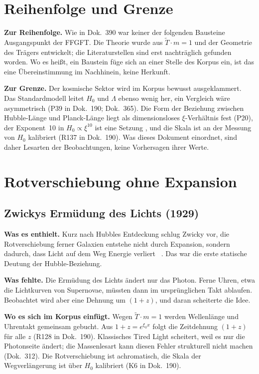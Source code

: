 \section{Reihenfolge und Grenze}

\textbf{Zur Reihenfolge.} Wie in Dok.~390 war keiner der folgenden Bausteine Ausgangspunkt der FFGFT.
Die Theorie wurde aus $\tilde T\cdot m=1$ und der Geometrie des Trägers entwickelt; die
Literaturstellen sind erst nachträglich gefunden worden. Wo es heißt, ein Baustein füge sich an
einer Stelle des Korpus ein, ist das eine Übereinstimmung im Nachhinein, keine Herkunft.

\textbf{Zur Grenze.} Der kosmische Sektor wird im Korpus bewusst ausgeklammert. Das Standardmodell
leitet $H_0$ und $\Lambda$ ebenso wenig her, ein Vergleich wäre asymmetrisch (P39 in Dok.~190;
Dok.~365). Die Form der Beziehung zwischen Hubble-Länge und Planck-Länge liegt als
dimensionsloses $\xi$-Verhältnis fest (P20), der Exponent~10 in $H_0\propto\xi^{10}$ ist eine
Setzung \SetzM, und die Skala ist an der Messung von $H_0$ kalibriert (R137 in Dok.~190). Was
dieses Dokument einordnet, sind daher Lesarten der Beobachtungen, keine Vorhersagen ihrer Werte.

\section{Rotverschiebung ohne Expansion}

\subsection{Zwickys Ermüdung des Lichts (1929)}

\textbf{Was es enthielt.} Kurz nach Hubbles Entdeckung schlug Zwicky vor, die Rotverschiebung
ferner Galaxien entstehe nicht durch Expansion, sondern dadurch, dass Licht auf dem Weg Energie
verliert \QM~\cite{Zwicky1929}. Das war die erste statische Deutung der Hubble-Beziehung.

\textbf{Was fehlte.} Die Ermüdung des Lichts ändert nur das Photon. Ferne Uhren, etwa die
Lichtkurven von Supernovae, müssten dann im ursprünglichen Takt ablaufen. Beobachtet wird aber eine
Dehnung um $(1+z)$, und daran scheiterte die Idee.

\textbf{Wo es sich im Korpus einfügt.} Wegen $\tilde T\cdot m=1$ werden Wellenlänge und Uhrentakt
gemeinsam gebucht. Aus $1+z=e^{\xi_0 x}$ folgt die Zeitdehnung $(1+z)$ für alle $z$ \BM{} (R128 in
Dok.~190). Klassisches Tired Light scheitert, weil es nur die Photonseite ändert; die Massenlesart
kann diesen Fehler strukturell nicht machen (Dok.~312). Die Rotverschiebung ist achromatisch, die
Skala der Wegverlängerung ist über $H_0$ kalibriert (K6 in Dok.~190).


